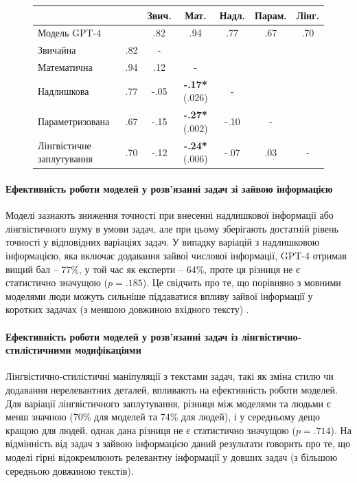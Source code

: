 \begin{figure}[!h]
    \centering
    \small
    \label{tab:forms_diff}
    \begin{tabular}{|l|c|ccccc|}
    \hline
    & & Звич. & Мат. & Надл. & Парам. & Лінг. \\
    \hline
    Модель GPT-4 & & .82 & .94 & .77 & .67 & .70 \\
    \hline
    Звичайна & .82 & - &  &  &  &  \\
    Математична & .94 & .12 & - &  &  &  \\
    Надлишкова & .77 & -.05 & \textbf{-.17*} (.026) & - &  &  \\
    Параметризована & .67 & -.15 & \textbf{-.27*} (.002) & -.10 & - &  \\
    Лінгвістичне заплутування & .70 & -.12 & \textbf{-.24*} (.006) & -.07 & .03 & - \\
    \hline
    \end{tabular}
\end{figure}

\paragraph{Ефективність роботи моделей у розв'язанні задач зі зайвою інформацією}
Моделі зазнають зниження точності при внесенні надлишкової інформації або лінгвістичного шуму в умови задач, але при цьому зберігають достатній рівень точності у відповідних варіаціях задач. У випадку варіацій з надлишковою інформацією, яка включає додавання зайвої числової інформації, GPT-4 отримав вищий бал -- 77\%, у той час як експерти -- 64\%, проте ця різниця не є статистично значущою ($p=.185$). Це свідчить про те, що порівняно з мовними моделями люди можуть сильніше піддаватися впливу зайвої інформації у коротких задачах (з меншою довжиною вхідного тексту) \cite{nikolaiev2024can}.

\paragraph{Ефективність роботи моделей у розв'язанні задач із лінгвістично-стилістичними модифікаціями}
Лінгвістично-стилістичні маніпуляції з текстами задач, такі як зміна стилю чи додавання нерелевантних деталей, впливають на ефективність роботи моделей. Для варіації лінгвістичного заплутування, різниця між моделями та людьми є менш значною (70\% для моделей та 74\% для людей), і у середньому дещо кращою для людей, однак дана різниця не є статистично значущою ($p=.714$). На відмінність від задач з зайвою інформацією даний результати говорить про те, що моделі гірні відокремлюють релевантну інформації у довших задач (з більшою середньою довжиною текстів). 

